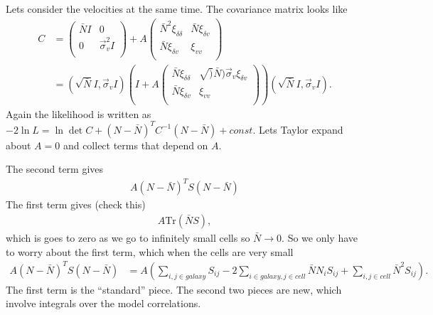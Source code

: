 \documentclass{aastex62}   	%
\begin{document}
Lets consider the velocities at the same time.  The covariance matrix looks like
\begin{align*}
C &=
\begin{pmatrix}
\bar{N} I &  0 \\
0&\vec{\sigma}_v^2 I \\
\end{pmatrix}
+A\begin{pmatrix}
\bar{N}^2\xi_{\delta\delta} &  \bar{N}\xi_{\delta v}\\
 \bar{N}\xi_{\delta v}& \xi_{vv} \\
  \end{pmatrix}\\
  & = \left(\sqrt{\bar{N}}I, \vec{\sigma}_v I \right) \left(I + 
  A\begin{pmatrix}
\bar{N}\xi_{\delta\delta} &  \sqrt)\bar{N}) \vec{\sigma}_v \xi_{\delta v}\\
 \bar{N}\xi_{\delta v}& \xi_{vv} \\
  \end{pmatrix}
  \right)\left(\sqrt{\bar{N}}I, \vec{\sigma}_v I \right).
\end{align*}
Again the likelihood is written as $-2\ln{L} = \ln{\det{C}} + (N-\bar{N})^T C^{-1}(N-\bar{N}) + const$.   Lets Taylor expand about $A=0$ and collect terms that
depend on $A$.  

The second term gives
\begin{align*}
A (N-\bar{N})^T S(N-\bar{N})
\end{align*}
The first term gives (check this)
\begin{align*}
A\text{Tr}(\bar{N}S),
\end{align*}
which is goes to zero as we go to infinitely small cells so $\bar{N} \rightarrow 0$.  So we only have to worry about the first term, which when the
cells are very small
\begin{align*}
A (N-\bar{N})^T S(N-\bar{N}) &= A \left( \sum_{i,j \in {galaxy}} S_{ij} -2 \sum_{i \in {galaxy}, j\in {cell}} \bar{N}N_i S_{ij}  +  \sum_{ i,j\in {cell}}  \bar{N}^2 S_{ij}\right).
\end{align*}
The first term is the ``standard'' piece.  The second two pieces are new, which involve integrals over the model correlations.
\end{document}
